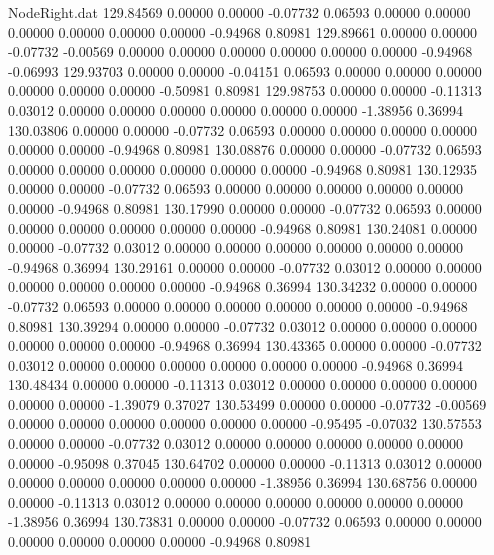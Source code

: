\begin{filecontents}{NodeRight.dat}
 129.84569    0.00000    0.00000    -0.07732    0.06593    0.00000    0.00000    0.00000    0.00000    0.00000    0.00000   -0.94968    0.80981
 129.89661    0.00000    0.00000    -0.07732   -0.00569    0.00000    0.00000    0.00000    0.00000    0.00000    0.00000   -0.94968   -0.06993
 129.93703    0.00000    0.00000    -0.04151    0.06593    0.00000    0.00000    0.00000    0.00000    0.00000    0.00000   -0.50981    0.80981
 129.98753    0.00000    0.00000    -0.11313    0.03012    0.00000    0.00000    0.00000    0.00000    0.00000    0.00000   -1.38956    0.36994
 130.03806    0.00000    0.00000    -0.07732    0.06593    0.00000    0.00000    0.00000    0.00000    0.00000    0.00000   -0.94968    0.80981
 130.08876    0.00000    0.00000    -0.07732    0.06593    0.00000    0.00000    0.00000    0.00000    0.00000    0.00000   -0.94968    0.80981
 130.12935    0.00000    0.00000    -0.07732    0.06593    0.00000    0.00000    0.00000    0.00000    0.00000    0.00000   -0.94968    0.80981
 130.17990    0.00000    0.00000    -0.07732    0.06593    0.00000    0.00000    0.00000    0.00000    0.00000    0.00000   -0.94968    0.80981
 130.24081    0.00000    0.00000    -0.07732    0.03012    0.00000    0.00000    0.00000    0.00000    0.00000    0.00000   -0.94968    0.36994
 130.29161    0.00000    0.00000    -0.07732    0.03012    0.00000    0.00000    0.00000    0.00000    0.00000    0.00000   -0.94968    0.36994
 130.34232    0.00000    0.00000    -0.07732    0.06593    0.00000    0.00000    0.00000    0.00000    0.00000    0.00000   -0.94968    0.80981
 130.39294    0.00000    0.00000    -0.07732    0.03012    0.00000    0.00000    0.00000    0.00000    0.00000    0.00000   -0.94968    0.36994
 130.43365    0.00000    0.00000    -0.07732    0.03012    0.00000    0.00000    0.00000    0.00000    0.00000    0.00000   -0.94968    0.36994
 130.48434    0.00000    0.00000    -0.11313    0.03012    0.00000    0.00000    0.00000    0.00000    0.00000    0.00000   -1.39079    0.37027
 130.53499    0.00000    0.00000    -0.07732   -0.00569    0.00000    0.00000    0.00000    0.00000    0.00000    0.00000   -0.95495   -0.07032
 130.57553    0.00000    0.00000    -0.07732    0.03012    0.00000    0.00000    0.00000    0.00000    0.00000    0.00000   -0.95098    0.37045
 130.64702    0.00000    0.00000    -0.11313    0.03012    0.00000    0.00000    0.00000    0.00000    0.00000    0.00000   -1.38956    0.36994
 130.68756    0.00000    0.00000    -0.11313    0.03012    0.00000    0.00000    0.00000    0.00000    0.00000    0.00000   -1.38956    0.36994
 130.73831    0.00000    0.00000    -0.07732    0.06593    0.00000    0.00000    0.00000    0.00000    0.00000    0.00000   -0.94968    0.80981

\end{filecontents}
